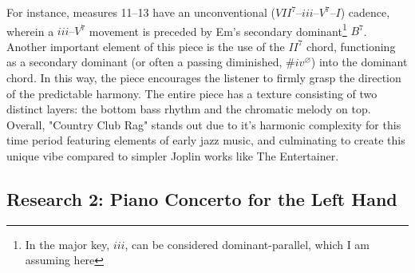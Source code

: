 \documentclass[11pt,a4paper]{article}
\begin{document}
For instance, measures 11–13 have an unconventional ($VII^7–iii–V^7–I$) cadence, wherein a $iii–V^7$ movement is preceded by Em's secondary dominant\footnote{In the major key, $iii$, can be considered dominant-parallel, which I am assuming here} $B^7$. Another important element of this piece is the use of the $II^7$ chord, functioning as a secondary dominant (or often a passing diminished, $\# iv^{\varnothing}$) into the dominant chord. In this way, the piece encourages the listener to firmly grasp the direction of the predictable harmony. The entire piece has a texture consisting of two distinct layers: the bottom bass rhythm and the chromatic melody on top. Overall, "Country Club Rag" stands out due to it's harmonic complexity for this time period featuring elements of early jazz music, and culminating to create this unique vibe compared to simpler Joplin works like The Entertainer.


\subsection{Research 2: Piano Concerto for the Left Hand}
\end{document}
